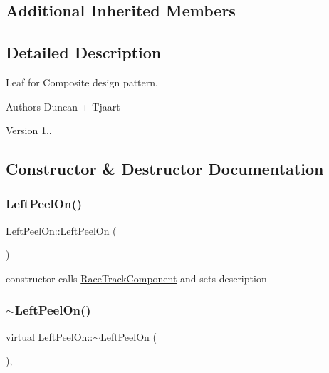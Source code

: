 \subsection*{Additional Inherited Members}


\subsection{Detailed Description}
Leaf for Composite design pattern. 

\begin{DoxyAuthor}{Authors}
Duncan + Tjaart 
\end{DoxyAuthor}
\begin{DoxyVersion}{Version}
1.. 
\end{DoxyVersion}


\subsection{Constructor \& Destructor Documentation}
\mbox{\label{class_left_peel_on_af11e174c739838ea4d2a36db409d1491}} 
\subsubsection{\texorpdfstring{Left\+Peel\+On()}{LeftPeelOn()}}
{\footnotesize\ttfamily Left\+Peel\+On\+::\+Left\+Peel\+On (\begin{DoxyParamCaption}{ }\end{DoxyParamCaption})\hspace{0.3cm}{\ttfamily [inline]}}

constructor calls \mbox{\hyperlink{class_race_track_component}{Race\+Track\+Component}} and sets description \mbox{\label{class_left_peel_on_aa6d2127bbd42e360689c646b1ac7e324}} 
\subsubsection{\texorpdfstring{$\sim$\+Left\+Peel\+On()}{~LeftPeelOn()}}
{\footnotesize\ttfamily virtual Left\+Peel\+On\+::$\sim$\+Left\+Peel\+On (\begin{DoxyParamCaption}{ }\end{DoxyParamCaption})\hspace{0.3cm}{\ttfamily [inline]}, {\ttfamily [virtual]}}

